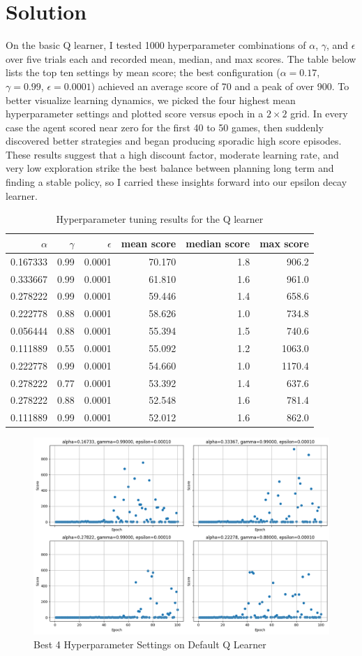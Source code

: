 \documentclass[submit]{../harvardml}
\newenvironment{solution}
  {\color{blue}\section*{Solution}}
{}
\begin{document}
\begin{solution}
On the basic Q learner, I tested 1000 hyperparameter combinations of $\alpha$, $\gamma$, and $\epsilon$ over five trials each and recorded mean, median, and max scores. The table below lists the top ten settings by mean score; the best configuration ($\alpha = 0.17$, $\gamma = 0.99$, $\epsilon = 0.0001$) achieved an average score of 70 and a peak of over 900. To better visualize learning dynamics, we picked the four highest mean hyperparameter settings and plotted score versus epoch in a $2 \times 2$ grid. In every case the agent scored near zero for the first 40 to 50 games, then suddenly discovered better strategies and began producing sporadic high score episodes. These results suggest that a high discount factor, moderate learning rate, and very low exploration strike the best balance between planning long term and finding a stable policy, so I carried these insights forward into our epsilon decay  learner.
\begin{table}[htbp]
\centering
\begin{tabular}{rrrrrr}
\hline
$\alpha$ & $\gamma$ & $\epsilon$ & mean score & median score & max score \\
\hline
0.167333 & 0.99 & 0.0001 & 70.170 & 1.8 & 906.2 \\
0.333667 & 0.99 & 0.0001 & 61.810 & 1.6 & 961.0 \\
0.278222 & 0.99 & 0.0001 & 59.446 & 1.4 & 658.6 \\
0.222778 & 0.88 & 0.0001 & 58.626 & 1.0 & 734.8 \\
0.056444 & 0.88 & 0.0001 & 55.394 & 1.5 & 740.6 \\
0.111889 & 0.55 & 0.0001 & 55.092 & 1.2 & 1063.0 \\
0.222778 & 0.99 & 0.0001 & 54.660 & 1.0 & 1170.4 \\
0.278222 & 0.77 & 0.0001 & 53.392 & 1.4 & 637.6 \\
0.278222 & 0.88 & 0.0001 & 52.548 & 1.6 & 781.4 \\
0.111889 & 0.99 & 0.0001 & 52.012 & 1.6 & 862.0 \\
\hline
\end{tabular}
\caption{Hyperparameter tuning results for the Q learner}

\end{table}
\begin{figure}
    \centering
    \includegraphics[width=0.8\linewidth]{hw6/img_output/p3plot1.png}
    \caption{Best 4 Hyperparameter Settings on Default Q Learner}
\end{figure}


\end{solution}
\end{document}
